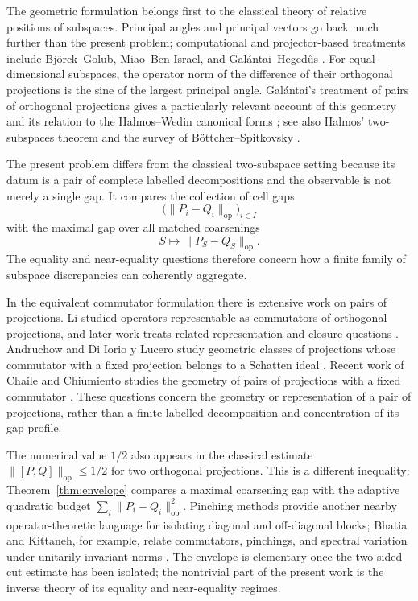 \documentclass[11pt]{article}
\newcommand{\op}{\mathrm{op}}
\begin{document}
The geometric formulation belongs first to the classical theory of relative
positions of subspaces.  Principal angles and principal vectors go back much
further than the present problem; computational and projector-based
treatments include Bj{\"o}rck--Golub, Miao--Ben-Israel, and
Gal{\'a}ntai--Heged{\H{u}}s
\cite{BjorckGolub1973,MiaoBenIsrael1992,GalantaiHegedus2006}.
For equal-dimensional subspaces, the operator norm of the difference of
their orthogonal projections is the sine of the largest principal angle.
Gal{\'a}ntai's treatment of pairs of orthogonal projections gives a
particularly relevant account of this geometry and its relation to the
Halmos--Wedin canonical forms \cite{Galantai2008}; see also
Halmos' two-subspaces theorem and the survey of B{\"o}ttcher--Spitkovsky
\cite{Halmos1969TwoSubspaces,BottcherSpitkovsky2010}.

The present problem differs from the classical two-subspace setting because
its datum is a pair of complete labelled decompositions and the observable is
not merely a single gap.  It compares the collection of cell gaps
\[
  \bigl(\|P_i-Q_i\|_{\op}\bigr)_{i\in I}
\]
with the maximal gap over all matched coarsenings
\[
  S\longmapsto\|P_S-Q_S\|_{\op}.
\]
The equality and near-equality questions therefore concern how a
finite family of subspace discrepancies can coherently aggregate.

In the equivalent commutator formulation there is extensive work on pairs of
projections.  Li studied operators representable as commutators of orthogonal
projections, and later work treats related representation and closure
questions
\cite{Li2004,ShiJi2019,MarcouxRadjaviZhang2024}.
Andruchow and Di Iorio y Lucero study geometric classes of projections whose
commutator with a fixed projection belongs to a Schatten ideal
\cite{AndruchowDiIorio2021}.  Recent work of Chaile and Chiumiento studies the
geometry of pairs of projections with a fixed commutator
\cite{ChaileChiumiento2026}.  These questions concern the geometry or
representation of a pair of projections, rather than a finite labelled
decomposition and concentration of its gap profile.

The numerical value $1/2$ also appears in the classical estimate
$\|[P,Q]\|_{\op}\le1/2$ for two orthogonal projections.  This is a different
inequality: Theorem~\ref{thm:envelope} compares a maximal coarsening gap with
the adaptive quadratic budget
$\sum_i\|P_i-Q_i\|_{\op}^2$.  Pinching methods provide another nearby
operator-theoretic language for isolating diagonal and off-diagonal blocks;
Bhatia and Kittaneh, for example, relate commutators, pinchings, and spectral
variation under unitarily invariant norms \cite{BhatiaKittaneh2008Pinching}.
The envelope is elementary once the two-sided cut estimate has been isolated;
the nontrivial part of the present work is the inverse theory of its equality
and near-equality regimes.
\end{document}

